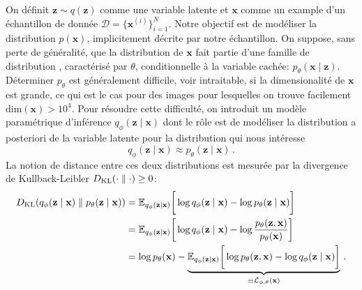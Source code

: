 On définit $\mathbf{z} \sim q(\mathbf{z})$ comme une variable latente et $\mathbf{x}$ comme un example d'un échantillon de donnée $\mathcal{D} = \{\mathbf{x}^{(i)}\}_{i=1}^{N}$. 
Notre objectif est de modéliser la distribution $p(\mathbf{x})$, implicitement décrite par notre échantillon. 
On suppose, sans perte de généralité, que la distribution de $\mathbf{x}$ fait partie d'une famille de distribution , caractérisé par $\theta$,  
conditionnelle à la variable cachée: $p_\theta(\mathbf{x \mid \mathbf{z}})$. 
Déterminer $p_\theta$ est généralement difficile, voir intraitable, si la dimensionalité de $\mathbf{x}$ est grande, ce qui est le cas 
pour des images pour lesquelles on trouve facilement $\mathrm{dim}(\mathbf{x}) > 10^{4}$. Pour résoudre cette difficulté, 
on introduit un modèle paramétrique d'inférence $q_\phi(\mathbf{z} \mid \mathbf{x})$ dont le rôle est de 
modéliser la distribution a posteriori de la variable latente pour la distribution qui nous intéresse
\begin{equation}\label{eq:vae 1}
        q_\phi (\mathbf{z} \mid \mathbf{x}) \approx p_\theta (\mathbf{z} \mid \mathbf{x})\, .
\end{equation} 
La notion de distance entre ces deux distributions est mesurée par la divergence de Kullback-Leibler $D_{\mathrm{KL}}(\cdot \mathrel{\Vert} \cdot) \geq 0$: 
\begin{align}
        \nonumber
       D_{\mathrm{KL}}(q_\phi(\mathbf{z} \mid \mathbf{x}) \mathrel{\Vert}  p_\theta (\mathbf{z} \mid \mathbf{x})) 
       &= \mathbb{E}_{q_\phi(\mathbf{z} \mid \mathbf{x})} \bigg[\log q_\phi(\mathbf{z} \mid \mathbf{x}) - \log p_\theta (\mathbf{z} \mid \mathbf{x}) \bigg]  \\
       \nonumber
       &= \mathbb{E}_{q_\phi(\mathbf{z} \mid \mathbf{x})} \bigg[\log q_\phi (\mathbf{z} \mid \mathbf{x}) -\log \frac{p_\theta(\mathbf{z}, \mathbf{x})}{p_\theta(\mathbf{x})} \bigg]  \\
       \label{eq:KL}
       &= \log p_\theta (\mathbf{x}) - \underbrace{\mathbb{E}_{q_\phi(\mathbf{z} \mid \mathbf{x})} \bigg[\log p_\theta(\mathbf{z}, \mathbf{x}) - \log q_\phi (\mathbf{z} \mid \mathbf{x}) \bigg]}_{\equiv \mathcal{L}_{\phi,\theta}(\mathbf{x})} \, .
\end{align} 

